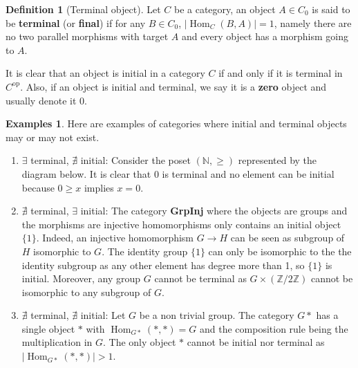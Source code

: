 \documentclass{article}
\theoremstyle{definition}
\newtheorem{defn}[thm]{Definition}
\newtheorem{exmps}[thm]{Examples}
\theoremstyle{remark}
\newcommand{\N}{\mathbb{N}}
\newcommand{\Z}{\mathbb{Z}}
\DeclareMathOperator{\Hom}{Hom}
\newcommand{\op}[1]{#1^{\text{op}}}
\begin{document}
\begin{defn}[Terminal object]
	Let $C$ be a category, an object $A \in C_0$ is said to be \textbf{terminal} (or \textbf{final}) if for any $B \in C_0$, $|\Hom_C(B,A)| = 1$, namely there are no two parallel morphisms with target $A$ and every object has a morphism going to $A$.
\end{defn}
It is clear that an object is initial in a category $C$ if and only if it is terminal in $\op{C}$. Also, if an object is initial and terminal, we say it is a \textbf{zero} object and usually denote it $0$.
\begin{exmps}
	Here are examples of categories where initial and terminal objects may or may not exist.
	\begin{enumerate}
		\item $\exists$ terminal, $\nexists$ initial: Consider the poset $(\N, \geq)$ represented by the diagram below. It is clear that $0$ is terminal and no element can be initial because $0 \geq x$ implies $x = 0$.
		\begin{figure}[h]
			\centering
		\end{figure}
		\item  $\nexists$ terminal, $\exists$ initial: The category \textbf{GrpInj} where the objects are groups and the morphisms are injective homomorphisms only contains an initial object $\{1\}$. Indeed, an injective homomorphism $G \rightarrow H$ can be seen as subgroup of $H$ isomorphic to $G$. The identity group $\{1\}$ can only be isomorphic to the the identity subgroup as any other element has degree more than 1, so $\{1\}$ is initial. Moreover, any group $G$ cannot be terminal as $G \times (\Z/2\Z)$ cannot be isomorphic to any subgroup of $G$.
		\item $\nexists$ terminal, $\nexists$ initial: Let $G$ be a non trivial group. The category $G*$ has a single object $*$ with $\Hom_{G*}(*, *) = G$ and the composition rule being the multiplication in $G$. The only object $*$ cannot be initial nor terminal as $|\Hom_{G*}(*,*)| > 1$.
		

\end{enumerate}
\end{exmps}
\end{document}
